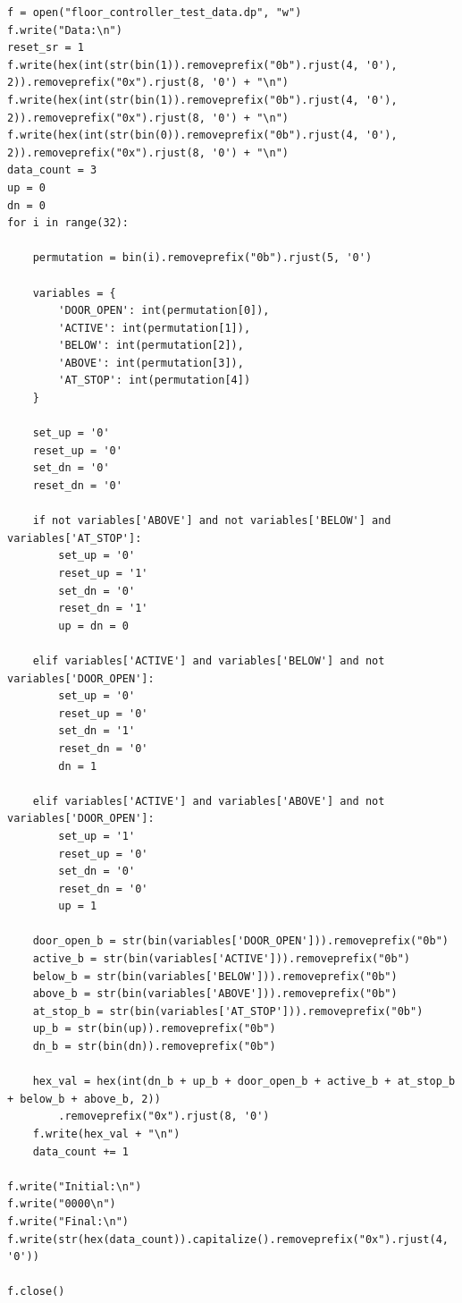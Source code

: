 \documentclass[a4paper]{article}
\begin{document}
\begin{verbatim}
f = open("floor_controller_test_data.dp", "w")
f.write("Data:\n")
reset_sr = 1
f.write(hex(int(str(bin(1)).removeprefix("0b").rjust(4, '0'), 2)).removeprefix("0x").rjust(8, '0') + "\n")
f.write(hex(int(str(bin(1)).removeprefix("0b").rjust(4, '0'), 2)).removeprefix("0x").rjust(8, '0') + "\n")
f.write(hex(int(str(bin(0)).removeprefix("0b").rjust(4, '0'), 2)).removeprefix("0x").rjust(8, '0') + "\n")
data_count = 3
up = 0
dn = 0
for i in range(32):

    permutation = bin(i).removeprefix("0b").rjust(5, '0')
    
    variables = {
        'DOOR_OPEN': int(permutation[0]),
        'ACTIVE': int(permutation[1]),
        'BELOW': int(permutation[2]),
        'ABOVE': int(permutation[3]),
        'AT_STOP': int(permutation[4])
    }

    set_up = '0'
    reset_up = '0'
    set_dn = '0'
    reset_dn = '0'

    if not variables['ABOVE'] and not variables['BELOW'] and variables['AT_STOP']:
        set_up = '0'
        reset_up = '1'
        set_dn = '0'
        reset_dn = '1'
        up = dn = 0

    elif variables['ACTIVE'] and variables['BELOW'] and not variables['DOOR_OPEN']:
        set_up = '0'
        reset_up = '0'
        set_dn = '1'
        reset_dn = '0'
        dn = 1

    elif variables['ACTIVE'] and variables['ABOVE'] and not variables['DOOR_OPEN']:
        set_up = '1'
        reset_up = '0'
        set_dn = '0'
        reset_dn = '0'
        up = 1

    door_open_b = str(bin(variables['DOOR_OPEN'])).removeprefix("0b")
    active_b = str(bin(variables['ACTIVE'])).removeprefix("0b")
    below_b = str(bin(variables['BELOW'])).removeprefix("0b")
    above_b = str(bin(variables['ABOVE'])).removeprefix("0b")
    at_stop_b = str(bin(variables['AT_STOP'])).removeprefix("0b")
    up_b = str(bin(up)).removeprefix("0b")
    dn_b = str(bin(dn)).removeprefix("0b")

    hex_val = hex(int(dn_b + up_b + door_open_b + active_b + at_stop_b + below_b + above_b, 2))
        .removeprefix("0x").rjust(8, '0')
    f.write(hex_val + "\n")
    data_count += 1

f.write("Initial:\n")
f.write("0000\n")
f.write("Final:\n")
f.write(str(hex(data_count)).capitalize().removeprefix("0x").rjust(4, '0'))

f.close()
\end{verbatim}
\end{document}
